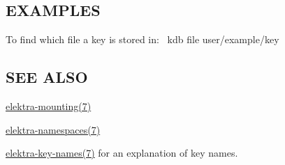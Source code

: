 \subsection*{E\+X\+A\+M\+P\+L\+ES}

To find which file a key is stored in\+:~\newline
 {\ttfamily kdb file user/example/key}~\newline


\subsection*{S\+EE A\+L\+SO}


\begin{DoxyItemize}
\item \hyperlink{md_doc_help_elektra-mounting_doc_help_elektra-mounting_md}{elektra-\/mounting(7)}
\item \hyperlink{md_doc_help_elektra-namespaces_doc_help_elektra-namespaces_md}{elektra-\/namespaces(7)}
\item \hyperlink{md_doc_help_elektra-key-names_doc_help_elektra-key-names_md}{elektra-\/key-\/names(7)} for an explanation of key names. 
\end{DoxyItemize}